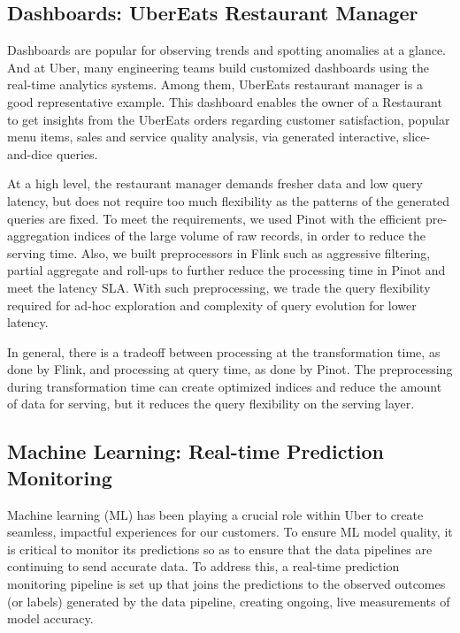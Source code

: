 \documentclass[sigconf]{acmart}
\begin{document}
\subsection{Dashboards: UberEats Restaurant Manager}
Dashboards are popular for observing trends and spotting anomalies at a glance. And at Uber, many engineering teams build customized dashboards using the real-time analytics systems. Among them, UberEats restaurant manager is a good representative example. This dashboard enables the owner of a Restaurant to get insights from the UberEats orders regarding customer satisfaction, popular menu items, sales and service quality analysis, via generated interactive, slice-and-dice queries. 

At a high level, the restaurant manager demands fresher data and low query latency, but does not require too much flexibility as the patterns of the generated queries are fixed. To meet the requirements, we used Pinot with the efficient pre-aggregation indices of the large volume of raw records, in order to reduce the serving time. Also, we built preprocessors in Flink such as aggressive filtering, partial aggregate and roll-ups to further reduce the processing time in Pinot and meet the latency SLA. With such preprocessing, we trade the query flexibility required for ad-hoc exploration and complexity of query evolution for lower latency. 

In general, there is a tradeoff between processing at the transformation time, as done by Flink, and processing at query time, as done by Pinot. The preprocessing during transformation time can create optimized indices and reduce the amount of data for serving, but it reduces the query flexibility on the serving layer.

\subsection{Machine Learning: Real-time Prediction Monitoring} \label{sec:ml-monitoring}

Machine learning (ML) has been playing a crucial role within Uber to create seamless, impactful experiences for our customers\cite{michelangelo}. To ensure ML model quality, it is critical to monitor its predictions so as to ensure that the data pipelines are continuing to send accurate data. To address this, a real-time prediction monitoring pipeline is set up that joins the predictions to the observed outcomes (or labels) generated by the data pipeline, creating ongoing, live measurements of model accuracy.
\end{document}
